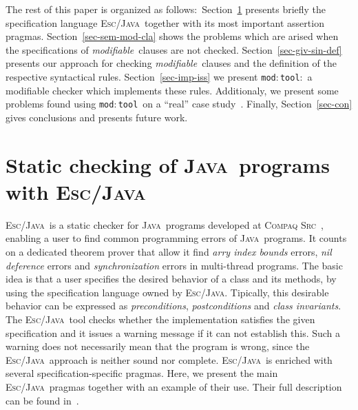 \documentclass[a4paper]{llncs}
\newcommand{\escj}{\textsc{Esc/Java}}
\newcommand{\java}{\textsc{Java}}
\newcommand{\csrc}{\textsc{Compaq Src}}
\newcommand{\modtool}{\texttt{mod$:$tool}}
\newcommand{\modif}{\textit{modifiable}}
\begin{document}
The rest of this paper is organized as follows$:$
Section~\ref{sec-esc-prg} presents briefly the specification language
\escj~together with its most important assertion
pragmas. Section~\ref{sec-sem-mod-cla} shows the problems which are
arised when the specifications of \modif~clauses are not
checked. Section~\ref{sec-giv-sin-def}
presents our approach for checking \modif~clauses and the definition
of the respective syntactical rules. Section~\ref{sec-imp-iss} we present \modtool$:$ a modifiable checker which implements these rules. Additionaly, we present some problems found using \modtool~on a ``real'' case study~\cite{CH02}.
Finally, Section~\ref{sec-con}
gives conclusions and presents future work.






\section{Static checking of \java~programs with \escj}
\label{sec-esc-prg}
\escj~is a static checker for \java~programs developed
at \csrc~\cite{ESC}, enabling a user to find common programming
errors of \java~programs. It counts on a dedicated theorem prover
that allow it find \emph{arry index bounds}
errors, \emph{nil deference} errors and \emph{synchronization} errors
in multi-thread programs. The basic idea is that
a user specifies the desired behavior of a class and its methods, by
using the specification language owned by \escj. Tipically, this
desirable behavior can be expressed as \textit{preconditions},
\textit{postconditions} and \textit{class invariants}. The \escj~tool
checks whether the implementation satisfies the given
specification and it issues a warning 
message if it can not establish this. Such a
warning does not necessarily mean that the program is
wrong, since the \escj~approach is neither sound nor
complete. \escj~is enriched with several
specification-specific pragmas. Here, we present
the main \escj~pragmas together with an example of their
use. Their full description can be found in~\cite{LeinoNS00}. 
\end{document}
